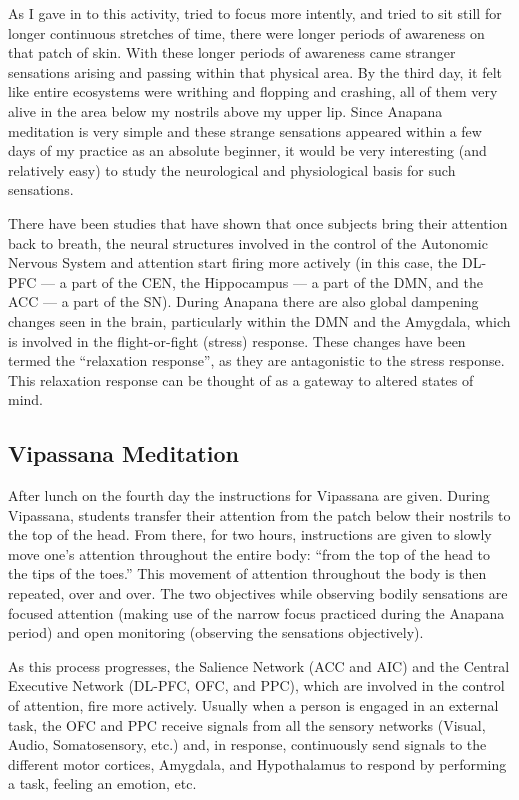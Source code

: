 \documentclass[a4paper, amsfonts, amssymb, amsmath, reprint, showkeys, nofootinbib, twoside]{revtex4-1}
\begin{document}
As I gave in to this activity, tried to focus more intently, and tried to sit still for
longer continuous stretches of time, there were longer periods of awareness on that
patch of skin. With these longer periods of awareness came
stranger sensations arising and passing within that physical area. By the third day,
it felt like entire ecosystems were writhing and flopping and crashing, all of them
very alive in the area below my nostrils above my upper lip. Since Anapana meditation
is very simple and these strange sensations appeared within a few days of my practice
as an absolute beginner, it would be very interesting (and relatively easy) to study
the neurological and physiological basis for such sensations.

There have been studies that have shown that once subjects bring their
attention back to breath, the neural structures involved in the control
of the Autonomic Nervous System and attention start firing more actively
(in this case, the DL-PFC --- a part of the CEN, the Hippocampus --- a part of the
DMN, and the ACC --- a part of the SN). During Anapana there are also global
dampening changes seen in the brain, particularly within the DMN and the Amygdala, which is involved in
the flight-or-fight (stress) response. These changes have been
termed the ``relaxation response'', as they are antagonistic to the stress
response. This relaxation response can be thought of as a gateway to altered states
of mind. \cite{relaxationresponse}

\subsection{Vipassana Meditation}

After lunch on the fourth day the instructions for Vipassana are given. During
Vipassana, students transfer their attention from the patch below their nostrils to the top
of the head. From there, for two hours, instructions are given to slowly move
one's attention throughout the entire body: ``from the top of the head to the tips of
the toes.'' This movement of attention throughout the body is then repeated, over and
over. The two objectives while observing bodily sensations are focused attention (making
use of the narrow focus practiced during the Anapana period) and open monitoring
(observing the sensations objectively).

As this process progresses, the Salience Network (ACC and AIC) and the Central Executive Network (DL-PFC, OFC,
and PPC), which are involved in the control of attention, fire more actively. Usually
when a person is engaged in an external task, the OFC and PPC receive signals
from all the sensory networks (Visual, Audio, Somatosensory, etc.) and, in response,
continuously send signals to the different motor cortices, Amygdala, and Hypothalamus to
respond by performing a task, feeling an emotion, etc.
\end{document}
